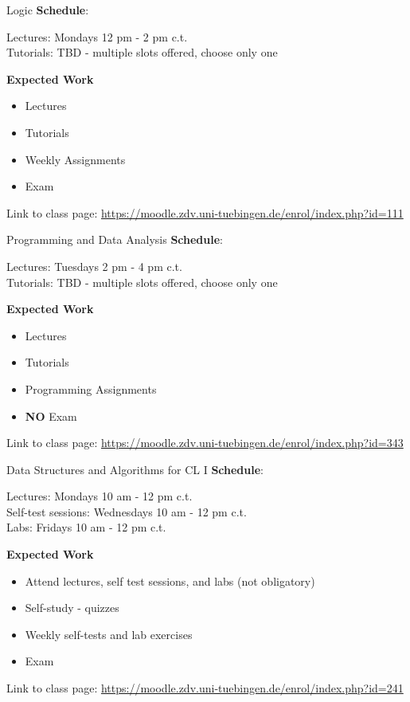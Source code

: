 \documentclass[aspectratio=169,hyperref={unicode},xcolor={dvipsnames}]{beamer}
\begin{document}
\begin{frame}{Logic}
		\textbf{Schedule}:
		
		Lectures: Mondays 12 pm - 2 pm c.t.\\
		Tutorials: TBD - multiple slots offered, choose only one
		\newline
		
		\textbf{Expected Work}
		\begin{itemize}
			\item Lectures
			\item Tutorials
			\item Weekly Assignments
			\item Exam
		\end{itemize}
		
		\begin{center}
	Link to class page: \url{https://moodle.zdv.uni-tuebingen.de/enrol/index.php?id=111}
\end{center}
\end{frame}

\begin{frame}{Programming and Data Analysis}
		\textbf{Schedule}:
		
		Lectures: Tuesdays 2 pm - 4 pm c.t.\\
		Tutorials: TBD - multiple slots offered, choose only one
		\newline
		
		\textbf{Expected Work}
		\begin{itemize}
			\item Lectures
			\item Tutorials
			\item Programming Assignments
			\item \textbf{NO} Exam
		\end{itemize}
		
		\begin{center}
	Link to class page: \url{https://moodle.zdv.uni-tuebingen.de/enrol/index.php?id=343}
\end{center}
\end{frame}

\begin{frame}{Data Structures and Algorithms for CL I}
		\textbf{Schedule}:
		
		Lectures: Mondays 10 am - 12 pm c.t.\\
		Self-test sessions: Wednesdays 10 am - 12 pm c.t.\\
		Labs: Fridays 10 am - 12 pm c.t.
			
		\textbf{Expected Work}
		\begin{itemize}
			\item Attend lectures, self test sessions, and labs (not obligatory)
			\item Self-study - quizzes
			\item Weekly self-tests and lab exercises
			\item Exam
		\end{itemize}
		
		\begin{center}
	Link to class page: \url{https://moodle.zdv.uni-tuebingen.de/enrol/index.php?id=241}
\end{center}
\end{frame}
\end{document}
